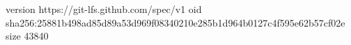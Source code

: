version https://git-lfs.github.com/spec/v1
oid sha256:25881b498ad85d89a53d969f08340210e285b1d964b0127c4f595e62b57cf02e
size 43840
